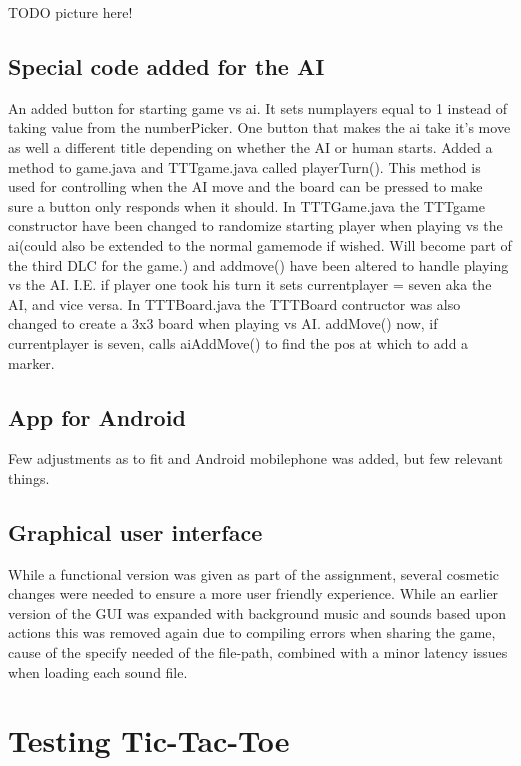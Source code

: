 \documentclass[a4paper,10pt]{article}
\begin{document}
TODO picture here!

\subsection{Special code added for the AI}
An added button for starting game vs ai. It sets numplayers equal to 1 instead of taking value from the numberPicker.
One button that makes the ai take it's move as well a different title depending on whether the AI or human starts.
Added a method to game.java and TTTgame.java called playerTurn(). This method is used for controlling when the AI move and the board can be pressed to make sure a button only responds when it should.
In TTTGame.java the TTTgame constructor have been changed to randomize starting player when playing vs the ai(could also be extended to the normal gamemode if wished. Will become part of the third DLC for the game.) and addmove() have been altered to handle playing vs the AI. I.E. if player one took his turn it sets currentplayer = seven aka the AI, and vice versa.
In TTTBoard.java the TTTBoard contructor was also changed to create a 3x3 board when playing vs AI. addMove() now, if currentplayer is seven, calls aiAddMove() to find the pos at which to add a marker.


\subsection{App for Android}
Few adjustments as to fit and Android mobilephone was added, but few relevant things.
\subsection{Graphical user interface}
While a functional version was given as part of the assignment, several cosmetic changes were needed to ensure a more user friendly experience. While an earlier version of the GUI was expanded with background music and sounds based upon actions this was removed again due to compiling errors when sharing the game, cause of the specify needed of the file-path, combined with a minor latency issues when loading each sound file.
	
	\section{Testing Tic-Tac-Toe}
	
\end{document}
